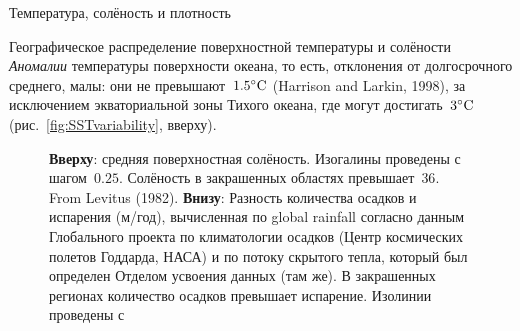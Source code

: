 \begin{chapter}{Температура, солёность и плотность}
\begin{section}{Географическое распределение поверхностной температуры и солёности}
\emph{Аномалии} температуры поверхности океана, то есть, отклонения от 
долгосрочного среднего, малы: они не превышают~${1.5}^\circ\mbox{C}$ (Harrison and Larkin, 1998), 
за исключением экваториальной зоны Тихого океана, где могут 
достигать~${3}^\circ\mbox{C}$ (рис.~\ref{fig:SSTvariability}, вверху).
%


\begin{figure}[t!]
\caption{\textbf{Вверху}: средняя поверхностная солёность. Изогалины проведены
с шагом~$0.25$. Солёность в закрашенных областях превышает~$36$.
From Levitus (1982).  
\textbf{Внизу}: Разность количества осадков и испарения (м/год), вычисленная
по global rainfall согласно данным Глобального проекта по климатологии осадков 
(Центр космических полетов Годдарда, НАСА) и по потоку скрытого тепла, 
который был определен Отделом усвоения данных (там же). В закрашенных
регионах количество осадков превышает испарение. Изолинии проведены с 
}
\end{figure}
\end{section}
\end{chapter}
